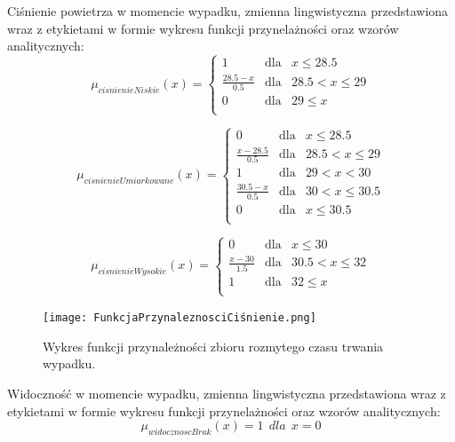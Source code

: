 \documentclass{classrep}
\begin{document}
Ciśnienie powietrza w momencie wypadku, zmienna lingwistyczna przedstawiona wraz z etykietami w formie wykresu funkcji przynelażności oraz wzorów analitycznych:
\begin{equation}
\mu _{cisnienieNiskie}(x) =  \left\{ \begin{array}{rcl}
 1 & \mbox{dla} & x  \leq 28.5 \\
\frac{28.5 - x}{0.5} & \mbox{dla} & 28.5 < x \leq 29\\
0 & \mbox{dla} & 29 \leq x\\
\end{array}\right.
\end{equation}

\begin{equation}
\mu _{cisnienieUmiarkowane}(x) =  \left\{ \begin{array}{rcl}
 0 & \mbox{dla} & x  \leq 28.5 \\
\frac{x - 28.5}{0.5} & \mbox{dla} & 28.5 < x \leq 29\\
1 & \mbox{dla} & 29 < x < 30\\
\frac{30.5 - x}{0.5} & \mbox{dla} & 30 < x \leq 30.5\\
 0 & \mbox{dla} & x  \leq 30.5 \\
\end{array}\right.
\end{equation}

\begin{equation}
\mu _{cisnienieWysokie}(x) =  \left\{ \begin{array}{rcl}
 0 & \mbox{dla} & x \leq 30 \\
\frac{x - 30}{1.5} & \mbox{dla} & 30.5 < x \leq 32\\
1 & \mbox{dla} & 32 \leq x\\
\end{array}\right.
\end{equation}

\begin{figure}[h!]
 \centering
 \texttt{[image: FunkcjaPrzynaleznosciCiśnienie.png]}
 \vspace{-0.3cm}
 \caption{Wykres funkcji przynależności zbioru rozmytego czasu trwania wypadku. }
 \label{rysunek do eksperymentu 1 wariantu 1}
\end{figure}
\newpage



Widoczność w momencie wypadku, zmienna lingwistyczna przedstawiona wraz z etykietami w formie wykresu funkcji przynelażności oraz wzorów analitycznych:
\begin{equation}
\mu _{widocznoscBrak}(x) =   1 \ \ dla \ \ x  = 0
\end{equation}
\end{document}
